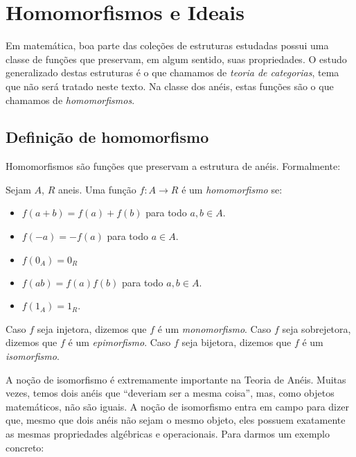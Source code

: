 \chapter{Homomorfismos e Ideais}
Em matemática, boa parte das coleções de estruturas estudadas possui uma classe de funções que preservam, em algum sentido, suas propriedades.
O estudo generalizado destas estruturas é o que chamamos de \emph{teoria de categorias}, tema que não será tratado neste texto.
Na classe dos anéis, estas funções são o que chamamos de \emph{homomorfismos}.
\section{Definição de homomorfismo}
Homomorfismos são funções que preservam a estrutura de anéis.
Formalmente:
\begin{definition}
Sejam $A$, $R$ aneis.
Uma função $f:A\rightarrow R$ é um \emph{homomorfismo} se:
\begin{itemize}
    \item $f(a+b)=f(a)+f(b)$ para todo $a, b \in A$.
    \item $f(-a)=-f(a)$ para todo $a \in A$.
    \item $f(0_A)=0_R$
    \item $f(ab)=f(a)f(b)$ para todo $a, b \in A$.
    \item $f(1_A)=1_R$.
\end{itemize}

Caso $f$ seja injetora, dizemos que $f$ é um \emph{monomorfismo}.
Caso $f$ seja sobrejetora, dizemos que $f$ é um \emph{epimorfismo}.
Caso $f$ seja bijetora, dizemos que $f$ é um \emph{isomorfismo}.
\end{definition}

A noção de isomorfismo é extremamente importante na Teoria de Anéis. Muitas vezes, temos dois anéis que ``deveriam ser a mesma coisa'', mas, como objetos matemáticos, não são iguais. A noção de isomorfismo entra em campo para dizer que, mesmo que dois anéis não sejam o mesmo objeto, eles possuem exatamente as mesmas propriedades algébricas e operacionais. Para darmos um exemplo concreto:

